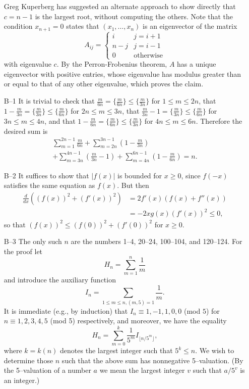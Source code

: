\documentclass[amssymb,twocolumn,pra,10pt,aps]{revtex4-1}
\begin{document}
\begin{itemize}
Greg Kuperberg has suggested an alternate approach to show directly
that $c=n-1$ is the largest root, without computing the others. Note
that the condition $x_{n+1} = 0$ states that $(x_1, \dots, x_n)$ is an
eigenvector of the matrix
\[
A_{ij} = \left\{ \begin{array}{cc} i & j = i + 1 \\ n-j & j=i-1 \\
0&\mbox{otherwise} \end{array} \right.
\]
with eigenvalue $c$. By the Perron-Frobenius theorem, $A$ has a unique
eigenvector with positive entries, whose eigenvalue has modulus
greater than or equal to that of any other eigenvalue, which proves
the claim.

\item[B--1]
It is trivial to check that $\frac{m}{6n}=\{\frac{m}{6n}\}\leq
\{\frac{m}{3n}\}$ for $1\leq m\leq 2n$, that
$1-\frac{m}{3n}=\{\frac{m}{3n}\}\leq \{\frac{m}{6n}\}$ for $2n\leq
m\leq 3n$, that $\frac{m}{3n}-1=\{\frac{m}{3n}\}\leq \{\frac{m}{6n}\}$
for $3n\leq m\leq 4n$, and that $1-\frac{m}{6n}=\{\frac{m}{6n}\}\leq
\{\frac{m}{3n}\}$ for $4n\leq m\leq 6n$.  Therefore the desired sum is
\begin{gather*}
\sum_{m=1}^{2n-1} \frac{m}{6n}
 +\sum_{m=2n}^{3n-1} \left(1-\frac{m}{3n} \right) \\
 +\sum_{m=3n}^{4n-1} \left(\frac{m}{3n}-1 \right) + \sum_{m=4n}^{6n-1} \left(
1-\frac{m}{6n} \right)
=n.
\end{gather*}

\item[B--2]
It suffices to show that $|f(x)|$ is bounded for $x \geq 0$, since $f(-x)$
satisfies the same equation as $f(x)$.  But then
\begin{align*}
\frac{d}{dx}\left(
(f(x))^2 + (f'(x))^2 \right) &= 2f'(x)(f(x)+f''(x)) \\
&= -2xg(x)(f'(x))^2 \leq 0,
\end{align*}
so that $(f(x))^2 \leq (f(0))^2 + (f'(0))^2$ for $x\geq 0$.

\item[B--3]
The only such $n$ are the numbers 1--4, 20--24, 100--104, and
120--124.  For the proof let
\[H_n=\sum_{m=1}^n \frac{1}{m}\]
and introduce the auxiliary function
\[I_n=\sum_{1\leq m\leq n, (m,5)=1} \frac{1}{m}.\]
It is immediate (e.g., by induction) that
$I_n\equiv 1,-1,1,0,0$ (mod $5$) for $n\equiv  1,2,3,4,5$ (mod 5)
respectively, and moreover, we have the equality
\[\label{(*)}
H_n= \sum_{m=0}^k \frac{1}{5^m} I_{\lfloor n/5^m \rfloor},\]
where $k=k(n)$ denotes the largest integer such that $5^k\leq n$.
We wish to determine those $n$ such that the above sum has nonnegative
5--valuation.  (By the 5--valuation of a number $a$ we mean
the largest integer $v$ such that $a/5^v$ is an integer.)


\end{itemize}
\end{document}
